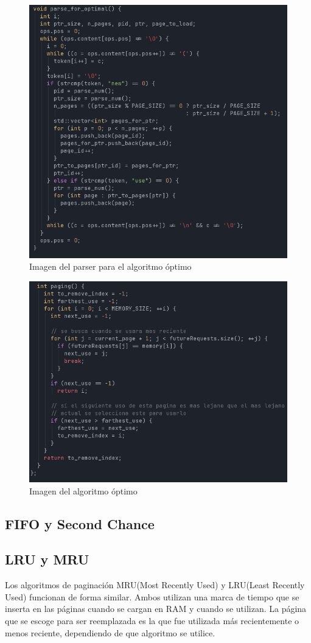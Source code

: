 \documentclass{report}
\begin{document}
\begin{figure}[h]
	\centering
	\includegraphics[width=0.8\linewidth]{figuras/parse_optimal.png}
	\caption{Imagen del parser para el algoritmo óptimo}
	\label{fig:parse_optimal}
\end{figure}



\begin{figure}[h]
	\centering
	\includegraphics[width=0.8\linewidth]{figuras/optimal.png}
	\caption{Imagen del algoritmo óptimo}
	\label{fig:optimal}
\end{figure}


\subsection{FIFO y Second Chance}
\subsection{LRU y MRU}
Los algoritmos de paginación MRU(Most Recently Used) y LRU(Least Recently Used) funcionan de forma similar.  Ambos utilizan una marca de tiempo que se inserta en las páginas cuando se cargan en RAM y cuando se utilizan.  La página que se escoge para ser reemplazada es la que fue utilizada más recientemente o menos reciente, dependiendo de que algoritmo se utilice.
\end{document}
